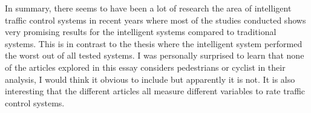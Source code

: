 \documentclass[10pt, a4paper]{article}
\begin{document}
In summary, there seems to have been a lot of research the area of intelligent traffic control systems in recent years where most of the studies conducted shows
very promising results for the intelligent systems compared to traditional systems. This is in contrast to the thesis where the intelligent system performed the worst
out of all tested systems. I was personally surprised to learn that none of the articles explored in this essay considers pedestrians or cyclist in their analysis,
I would think it obvious to include but apparently it is not. It is also interesting that the different articles all measure different variables to rate traffic
control systems. 




\end{document}
